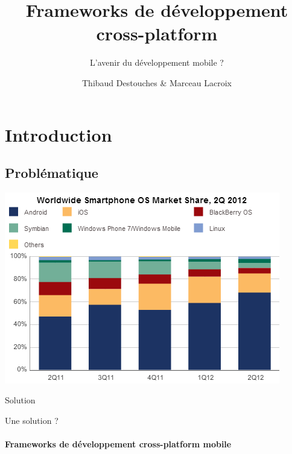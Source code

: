 \documentclass{beamer}
\title{Frameworks de développement cross-platform}
\subtitle{L'avenir du développement mobile ?}
\author{Thibaud Destouches \& Marceau Lacroix}
\date{}
\institute{ISTIC -- Université de Rennes 1}
\begin{document}
\begin{frame}[fragile]
\titlepage
\end{frame}

\begin{frame}
\setcounter{tocdepth}{2}
\tableofcontents
\end{frame}

\section{Introduction}
\subsection{Problématique}

\begin{frame}
  \includegraphics[scale=0.9]{segm}
\end{frame}

\begin{frame}{Solution}
\begin{center}
  Une solution ?
  \\ ~ \\
  \textbf{Frameworks de développement cross-platform mobile}
\end{center}
\end{frame}
\end{document}
